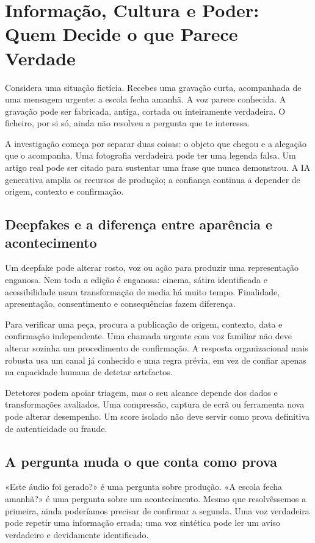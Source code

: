 \chapter{Informação, Cultura e Poder: Quem Decide o que Parece Verdade}
\label{ch:poder}

Considera uma situação fictícia. Recebes uma gravação curta, acompanhada de uma mensagem urgente: a escola fecha amanhã. A voz parece conhecida. A gravação pode ser fabricada, antiga, cortada ou inteiramente verdadeira. O ficheiro, por si só, ainda não resolveu a pergunta que te interessa.

A investigação começa por separar duas coisas: o objeto que chegou e a alegação que o acompanha. Uma fotografia verdadeira pode ter uma legenda falsa. Um artigo real pode ser citado para sustentar uma frase que nunca demonstrou. A IA generativa amplia os recursos de produção; a confiança continua a depender de origem, contexto e confirmação.

\section{Deepfakes e a diferença entre aparência e acontecimento}
Um deepfake pode alterar rosto, voz ou ação para produzir uma representação enganosa. Nem toda a edição é enganosa: cinema, sátira identificada e acessibilidade usam transformação de media há muito tempo. Finalidade, apresentação, consentimento e consequências fazem diferença.

Para verificar uma peça, procura a publicação de origem, contexto, data e confirmação independente. Uma chamada urgente com voz familiar não deve alterar sozinha um procedimento de confirmação. A resposta organizacional mais robusta usa um canal já conhecido e uma regra prévia, em vez de confiar apenas na capacidade humana de detetar artefactos.

Detetores podem apoiar triagem, mas o seu alcance depende dos dados e transformações avaliados. Uma compressão, captura de ecrã ou ferramenta nova pode alterar desempenho. Um score isolado não deve servir como prova definitiva de autenticidade ou fraude.

\section{A pergunta muda o que conta como prova}
«Este áudio foi gerado?» é uma pergunta sobre produção. «A escola fecha amanhã?» é uma pergunta sobre um acontecimento. Mesmo que resolvêssemos a primeira, ainda poderíamos precisar de confirmar a segunda. Uma voz verdadeira pode repetir uma informação errada; uma voz sintética pode ler um aviso verdadeiro e devidamente identificado.

